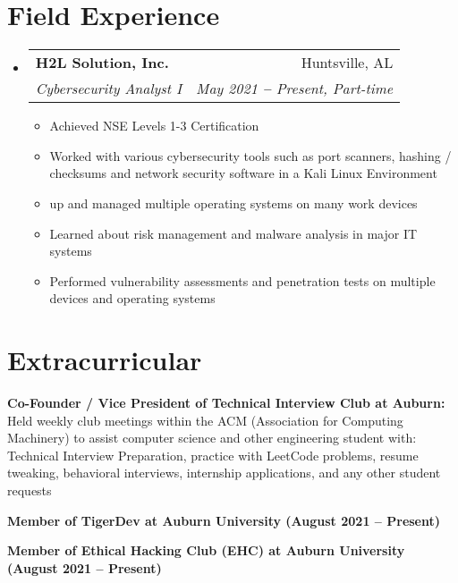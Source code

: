 \documentclass[letterpaper,11pt]{article}
\makeatletter
\newcommand{\resumeItem}[1]{
  \item\small{
    {#1 \vspace{-2pt}}
  }
}
\newcommand{\resumeSubheading}[4]{
  \vspace{-2pt}\item
    \begin{tabular*}{0.97\textwidth}[t]{l@{\extracolsep{\fill}}r}
      \textbf{#1} & #2 \\
      \textit{\small#3} & \textit{\small #4} \\
    \end{tabular*}\vspace{-7pt}
}
\newcommand{\resumeSubHeadingListStart}{\begin{itemize}[leftmargin=0.15in, label={}]}
\newcommand{\resumeSubHeadingListEnd}{\end{itemize}}
\newcommand{\resumeItemListStart}{\begin{itemize}}
\newcommand{\resumeItemListEnd}{\end{itemize}\vspace{-5pt}}
\makeatother
\begin{document}

\section{Field Experience}
  \vspace{3pt}
  \resumeSubHeadingListStart

    \resumeSubheading
      {H2L Solution, Inc.}{Huntsville, AL}
      {Cybersecurity Analyst I}{May 2021 \textbf{--} Present, Part-time}
        \resumeItemListStart
            \resumeItem{Achieved NSE Levels 1-3 Certification}

			\resumeItem {Worked with various cybersecurity tools such as port scanners, hashing / checksums and network security software in a Kali Linux Environment}
			\resumeItem { up and managed multiple operating systems on many work devices}
			\resumeItem {Learned about risk management and malware analysis in major IT systems} 
			\resumeItem {Performed vulnerability assessments and penetration tests on multiple devices and operating systems}

        \resumeItemListEnd
    
    
   
    
  \resumeSubHeadingListEnd







\section{Extracurricular}
  \vspace{2pt}
  \resumeSubHeadingListStart
    \small{\item{
        \textbf{Co-Founder / Vice President of Technical Interview Club at Auburn: }{Held weekly club meetings within the ACM (Association for Computing Machinery) to assist computer science and other engineering student with: Technical Interview Preparation, practice with LeetCode problems, resume tweaking, behavioral interviews, internship applications, and any other student requests} \\ \vspace{3pt}

        \textbf{Member of TigerDev at Auburn University (August 2021 \textbf{--} Present)} \\ \vspace{3pt}
    
        \textbf{Member of Ethical Hacking Club (EHC) at Auburn University (August 2021 \textbf{--} Present)} \\ \vspace{3pt}
        
       
    }}
  \resumeSubHeadingListEnd
\end{document}
